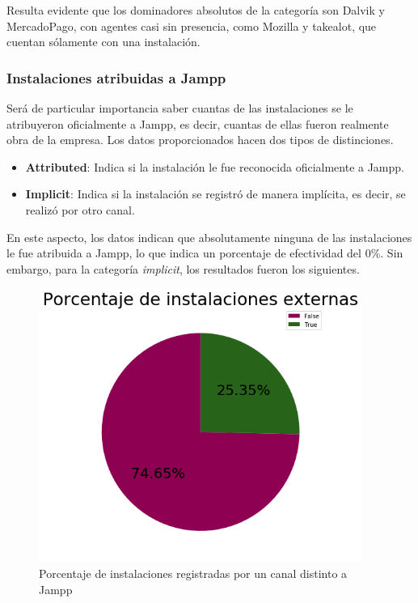\documentclass[a4paper, 12pt]{article}
\begin{document}
		Resulta evidente que los dominadores absolutos de la categoría son Dalvik y MercadoPago, con agentes casi sin presencia, como Mozilla y takealot, que cuentan sólamente con una instalación.

		\subsubsection{Instalaciones atribuidas a Jampp}
		Será de particular importancia saber cuantas de las instalaciones se le atribuyeron oficialmente a Jampp, es decir, cuantas de ellas fueron realmente obra de la empresa. Los datos proporcionados hacen dos tipos de distinciones.

		\FloatBarrier
		\begin{itemize}
		\item \textbf{Attributed}: Indica si la instalación le fue reconocida oficialmente a Jampp.
		\item \textbf{Implicit}: Indica si la instalación se registró de manera implícita, es decir, se realizó por otro canal.
		\end{itemize}
		\FloatBarrier

		En este aspecto, los datos indican que absolutamente ninguna de las instalaciones le fue atribuida a Jampp, lo que indica un porcentaje de efectividad del 0\%. Sin embargo, para la categoría \textit{implicit}, los resultados fueron los siguientes.

		\FloatBarrier
		\begin{figure}[h]
			\centering
			\includegraphics[width=300pt]{images/installs/implicit.png}
			\caption{Porcentaje de instalaciones registradas por un canal distinto a Jampp}
		\end{figure}
		\FloatBarrier
\end{document}
